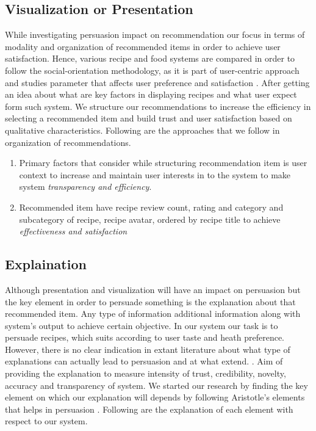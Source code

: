 \subsection{Visualization or Presentation}

While investigating persuasion impact on recommendation our focus in terms of modality and organization of recommended items in order to achieve user satisfaction.  Hence, various recipe and food systems are compared in order to follow the social-orientation methodology, as it is part of user-centric approach and studies parameter that affects user preference and satisfaction \cite{ swearingen2002interaction}. After getting an idea about what are key factors in displaying recipes and what user expect form such system.  We structure our recommendations to increase the efficiency in selecting a recommended item and build trust and user satisfaction based on qualitative characteristics. Following are the approaches that we follow in organization of recommendations.

\begin{enumerate}
	\item Primary factors that consider while structuring recommendation item is user context to increase and maintain user interests in to the system to make system \textit{transparency and efficiency}. 
	
	\item Recommended item have recipe review count, rating and category and subcategory of recipe, recipe avatar, ordered by recipe title to achieve \textit{ effectiveness and satisfaction}
\end{enumerate}

\subsection{Explaination}

Although presentation and visualization will have an impact on persuasion but the key element in order to persuade something is the explanation about that recommended item. Any type of information additional information along with system’s output to achieve certain objective.  In our system our task is to persuade recipes, which suits according to user taste and heath preference. However, there is no clear indication in extant literature about what type of explanations can actually lead to persuasion and at what extend.  . Aim of providing the explanation to measure intensity of trust, credibility, novelty, accuracy and transparency of system. We started our research by finding the key element on which our explanation will depends by following Aristotle’s elements that helps in persuasion \cite{gkika2014persuasive}. Following are the explanation of each element with respect to our system.

